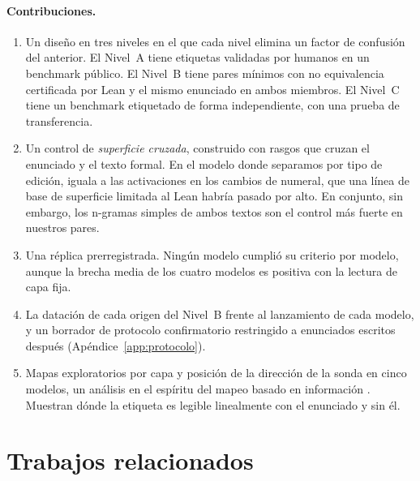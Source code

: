 \documentclass[10pt]{article}
\begin{document}
\paragraph{Contribuciones.}
\begin{enumerate}
\item Un diseño en tres niveles en el que cada nivel elimina un factor de confusión del anterior. El Nivel~A tiene
etiquetas validadas por humanos en un benchmark público. El Nivel~B tiene pares mínimos con no equivalencia
certificada por Lean y el mismo enunciado en ambos miembros. El Nivel~C tiene un benchmark etiquetado de forma
independiente, con una prueba de transferencia.
\item Un control de \emph{superficie cruzada}, construido con rasgos que cruzan el enunciado y el texto formal. En el
modelo donde separamos por tipo de edición, iguala a las activaciones en los cambios de numeral, que una línea de
base de superficie limitada al Lean habría pasado por alto. En conjunto, sin embargo, los n-gramas simples de ambos
textos son el control más fuerte en nuestros pares.
\item Una réplica prerregistrada. Ningún modelo cumplió su criterio por modelo, aunque la brecha media de los cuatro
modelos es positiva con la lectura de capa fija.
\item La datación de cada origen del Nivel~B frente al lanzamiento de cada modelo, y un borrador de protocolo
confirmatorio restringido a enunciados escritos después (Apéndice~\ref{app:protocolo}).
\item Mapas exploratorios por capa y posición de la dirección de la sonda en cinco modelos, un análisis en el
espíritu del mapeo basado en información \citep{searchlight}. Muestran dónde la etiqueta es legible linealmente con
el enunciado y sin él.
\end{enumerate}

\section{Trabajos relacionados}
\end{document}
